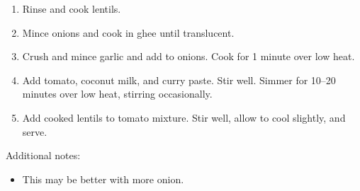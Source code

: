 
\begin{ingredients}
\end{ingredients}


\begin{recipe}
  \begin{enumerate}

  \item Rinse and cook lentils.

  \item Mince onions and cook in ghee until translucent.

  \item Crush and mince garlic and add to onions.  Cook for 1 minute over low heat.

  \item Add tomato, coconut milk, and curry paste.  Stir well.  Simmer
    for 10--20 minutes over low heat, stirring occasionally.

  \item Add cooked lentils to tomato mixture.  Stir well, allow to
    cool slightly, and serve.

  \end{enumerate}

  Additional notes:
  \begin{itemize}
  \item This may be better with more onion.
  \end{itemize}
\end{recipe}
